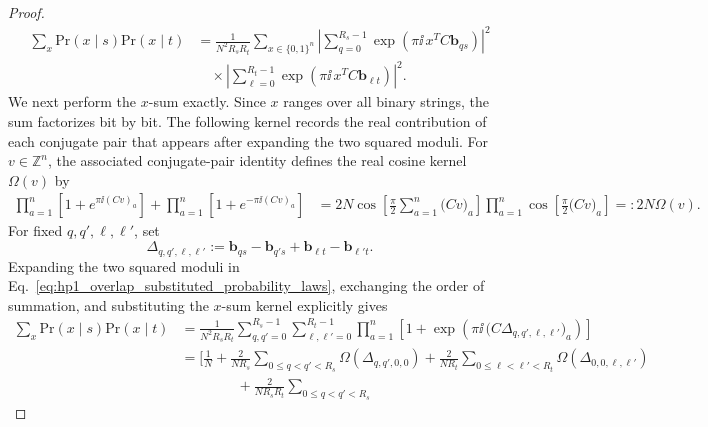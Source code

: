 \begin{proof}
\begin{align}
	    \sum_x \mathrm{Pr}(x\mid s)\mathrm{Pr}(x\mid t)
	    &=
	    \frac{1}{N^2R_sR_t}
    \sum_{x\in\{0,1\}^n}
    \left|
        \sum_{q=0}^{R_s-1}
        \exp\!\left(\pi\ii\,x^T C\mathbf b_{qs}\right)
    \right|^2 \nonumber\\
    &\quad\times
    \left|
        \sum_{\ell=0}^{R_t-1}
        \exp\!\left(\pi\ii\,x^T C\mathbf b_{\ell t}\right)
    \right|^2 .
    \label{eq:hp1_overlap_substituted_probability_laws}
	\end{align}
We next perform the \(x\)-sum exactly.  Since \(x\) ranges over all binary
strings, the sum factorizes bit by bit.  The following kernel records the real
contribution of each conjugate pair that appears after expanding the two
squared moduli.
For \(v\in\mathbb Z^n\), the associated conjugate-pair identity defines the
real cosine kernel \(\Omega(v)\) by
\begin{equation}
    \begin{aligned}
    \prod_{a=1}^n
    \left[1+e^{\pi\ii(Cv)_a}\right]
    +
    \prod_{a=1}^n
    \left[1+e^{-\pi\ii(Cv)_a}\right]
    &=
    2N
    \cos\!\left[
        \frac{\pi}{2}
        \sum_{a=1}^n
        \bigl(Cv\bigr)_a
    \right]
    \prod_{a=1}^n
    \cos\!\left[
        \frac{\pi}{2}
        \bigl(Cv\bigr)_a
    \right]
    =:
    2N\Omega(v).
    \end{aligned}
    \label{eq:hp1_overlap_real_cosine_kernel}
\end{equation}
	For fixed \(q,q',\ell,\ell'\), set
	\[
	    \Delta_{q,q',\ell,\ell'}
    :=
    \mathbf b_{qs}-\mathbf b_{q's}
    +\mathbf b_{\ell t}-\mathbf b_{\ell't}.
\]
Expanding the two squared moduli in
Eq.~\eqref{eq:hp1_overlap_substituted_probability_laws}, exchanging the order
of summation, and substituting the \(x\)-sum kernel explicitly gives
\begin{align}
    \sum_x \mathrm{Pr}(x\mid s)\mathrm{Pr}(x\mid t)
    &=
    \frac{1}{N^2R_sR_t}
    \sum_{q,q'=0}^{R_s-1}
    \sum_{\ell,\ell'=0}^{R_t-1}
    \prod_{a=1}^n
    \left[
        1+\exp\!\left(
            \pi\ii\,\bigl(C\Delta_{q,q',\ell,\ell'}\bigr)_a
        \right)
    \right] \nonumber\\
    &=
    \Bigg[
        \frac{1}{N}
        +\frac{2}{NR_s}
        \sum_{0\le q<q'<R_s}
        \Omega\!\left(\Delta_{q,q',0,0}\right)
        +\frac{2}{NR_t}
        \sum_{0\le \ell<\ell'<R_t}
        \Omega\!\left(\Delta_{0,0,\ell,\ell'}\right)
        \nonumber\\
    &\qquad\qquad
        +\frac{2}{NR_sR_t}
        \sum_{0\le q<q'<R_s}

\end{align}
\end{proof}
